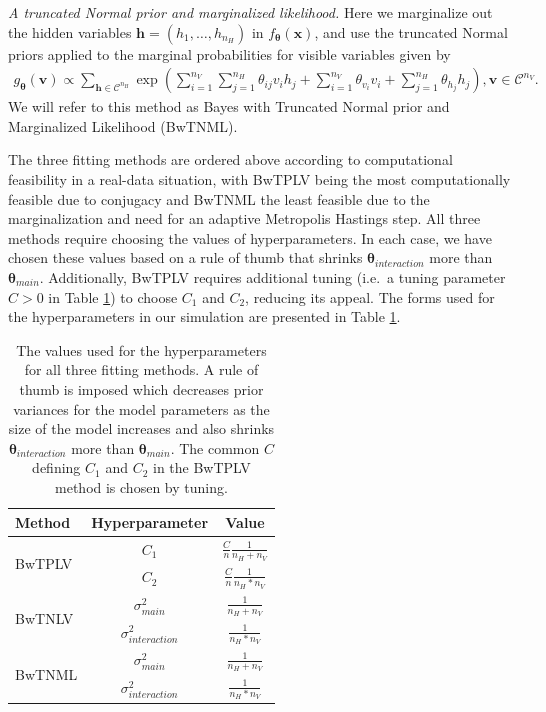 \documentclass[]{article}
\theoremstyle{definition}
\newcommand{\nv}{{n_{\scriptscriptstyle V}}}
\newcommand{\nh}{{n_{\scriptscriptstyle H}}}
\begin{document}
\begin{enumerate}
  \emph{A truncated Normal prior and marginalized likelihood.} Here we
  marginalize out the hidden variables
  \(\boldsymbol h = (h_1, \dots, h_\nh)\) in
  \(f_{\boldsymbol \theta}(\boldsymbol x)\), and use the truncated
  Normal priors applied to the marginal probabilities for visible
  variables given by \begin{align*}
   g_{\boldsymbol \theta}(\boldsymbol v) \propto \sum\limits_{\boldsymbol h \in \mathcal{C}^\nh} \exp\left(\sum\limits_{i = 1}^\nv \sum\limits_{j=1}^\nh \theta_{ij} v_i h_j + \sum\limits_{i = 1}^\nv\theta_{v_i} v_i + \sum\limits_{j = 1}^\nh\theta_{h_j} h_j\right), \boldsymbol v \in \mathcal{C}^\nv.
   \end{align*} We will refer to this method as Bayes with Truncated
  Normal prior and Marginalized Likelihood (BwTNML).
\end{enumerate}
The three fitting methods are ordered above according to computational
feasibility in a real-data situation, with BwTPLV being the most
computationally feasible due to conjugacy and BwTNML the least feasible
due to the marginalization and need for an adaptive Metropolis Hastings
step. All three methods require choosing the values of hyperparameters.
In each case, we have chosen these values based on a rule of thumb that
shrinks \(\boldsymbol \theta_{interaction}\) more than
\(\boldsymbol \theta_{main}\). Additionally, BwTPLV requires additional
tuning (i.e.~a tuning parameter \(C > 0\) in Table \ref{tab:hyperparam})
to choose \(C_1\) and \(C_2\), reducing its appeal. The forms used for
the hyperparameters in our simulation are presented in Table
\ref{tab:hyperparam}.
\begin{table}[ht]
\centering
\begin{tabular}{|l|c|c|}
\hline 
Method & Hyperparameter & Value \\ 
\hline \hline
\multirow{2}{*}{BwTPLV} & $C_1$ & $\frac{C}{n}\frac{1}{\nh + \nv}$ \\
 & $C_2$ & $\frac{C}{n}\frac{1}{\nh*\nv}$ \\
\hline
\multirow{2}{*}{BwTNLV} & $\sigma^2_{main}$ & $\frac{1}{\nh + \nv}$ \\
 & $\sigma^2_{interaction}$ & $\frac{1}{\nh*\nv}$ \\
\hline
\multirow{2}{*}{BwTNML} & $\sigma^2_{main}$ & $\frac{1}{\nh + \nv}$ \\
 & $\sigma^2_{interaction}$ & $\frac{1}{\nh*\nv}$ \\
\hline
\end{tabular}
\caption{The values used for the hyperparameters for all three fitting methods. A rule of thumb is imposed which decreases prior variances for the model parameters as the size of the model increases and also shrinks $\boldsymbol \theta_{interaction}$ more than $\boldsymbol \theta_{main}$. The common $C$ defining $C_1$ and $C_2$  in the BwTPLV method is chosen by tuning.}
\label{tab:hyperparam}
\end{table}
\par
\end{document}
